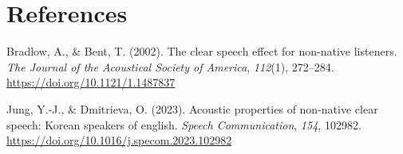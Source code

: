 \documentclass[
  man,
  floatsintext,
  longtable,
  nolmodern,
  notxfonts,
  notimes,
  colorlinks=true,linkcolor=blue,citecolor=blue,urlcolor=blue]{apa7}
\newlength{\cslhangindent}
\newenvironment{CSLReferences}[2] %
 {\begin{list}{}{%
  \setlength{\itemindent}{0pt}
  \setlength{\leftmargin}{0pt}
  \setlength{\parsep}{0pt}
  \ifodd #1
   \setlength{\leftmargin}{\cslhangindent}
   \setlength{\itemindent}{-1\cslhangindent}
  \fi
  \setlength{\itemsep}{#2\baselineskip}}}
 {\end{list}}
\begin{document}
\clearpage

\section{References}\label{references}

\label{refs}
\begin{CSLReferences}{1}{0}
Bradlow, A., \& Bent, T. (2002). The clear speech effect for non-native
listeners. \emph{The Journal of the Acoustical Society of America},
\emph{112}(1), 272--284. \url{https://doi.org/10.1121/1.1487837}

Jung, Y.-J., \& Dmitrieva, O. (2023). Acoustic properties of non-native
clear speech: Korean speakers of english. \emph{Speech Communication},
\emph{154}, 102982. \url{https://doi.org/10.1016/j.specom.2023.102982}

\end{CSLReferences}
\end{document}
